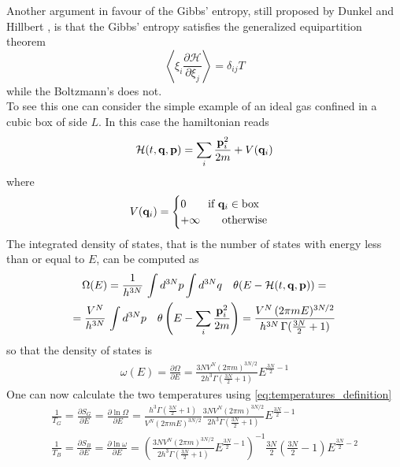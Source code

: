 Another argument in favour of the Gibbs' entropy, still proposed by Dunkel and Hillbert \cite{Dunkel_Hillbert}, is that the Gibbs' entropy satisfies the generalized equipartition theorem
\begin{equation}
    \left\langle\xi_{i} \frac{\partial \mathcal{H}}{\partial \xi_{j}}\right\rangle=\delta_{i j} T
    \label{eq:equipartition}
\end{equation}
while the Boltzmann's does not.  \\
To see this one can consider the simple example of an ideal gas confined in a cubic box of side $L$. In this case the hamiltonian reads 
\begin{equation*}
    \mathcal{H}(t,\mathbf{q},\mathbf{p}) = \sum_i \frac{\mathbf{p}_i^2}{2m} + V(\mathbf{q}_i)
\end{equation*}
where 
\begin{equation*}
    V(\mathbf{q}_i) = 
    \begin{cases}
        0 \qquad \text{if } \mathbf{q}_i \in \text{box} \\
        +\infty \qquad \text{otherwise}
    \end{cases}
\end{equation*}
The integrated density of states, that is the number of states with energy less than or equal to $E$, can be computed as 
\begin{gather*}
    \Omega(E) = \frac{1}{h^{3N}} \, \int d^{3N}p \int d^{3N}q \quad \theta(E-\mathcal{H}(t, \mathbf{q}, \mathbf{p})) = \\ = \frac{V^N}{h^{3N}} \, \int d^{3N}p \quad \theta\left(E - \sum_i \frac{\mathbf{p}_i^2}{2m}\right) 
    = \frac{V^N \, (2\pi mE)^{3N/2}}{h^{3N} \, \Gamma(\frac{3N}{2}+1)}
\end{gather*}
so that the density of states is 
\begin{gather*}
    \omega(E)=\frac{\partial \Omega}{\partial E}=\frac{3 N V^{N}(2 \pi m)^{3 N / 2}}{2 h^{3} \Gamma\left(\frac{3 N}{2}+1\right)} E^{\frac{3 N}{2}-1}
\end{gather*}
One can now calculate the two temperatures using \ref{eq:temperatures_definition}
\begin{gather*}
    \frac{1}{T_{G}}=\frac{\partial S_{G}}{\partial E}=\frac{\partial \ln \Omega}{\partial E}=\frac{h^{3} \Gamma\left(\frac{3 N}{2}+1\right)}{V^{N}(2 \pi m E)^{3 N / 2}} \frac{3 N V^{N}(2 \pi m)^{3 N / 2}}{2 h^{3} \Gamma\left(\frac{3 N}{2}+1\right)} E^{\frac{3 N}{2}-1} \\
    \frac{1}{T_{B}}=\frac{\partial S_{B}}{\partial E}=\frac{\partial \ln \omega}{\partial E}=\left(\frac{3 N V^{N}(2 \pi m)^{3 N / 2}}{2 h^{3} \Gamma\left(\frac{3 N}{2}+1\right)} E^{\frac{3 N}{2}-1}\right)^{-1} \frac{3 N}{2}\left(\frac{3 N}{2}-1\right) E^{\frac{3 N}{2}-2}
\end{gather*}
